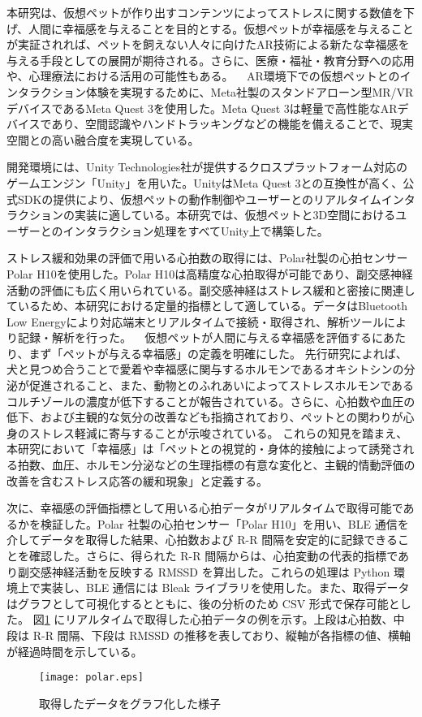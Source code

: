 \documentclass[a4j]{ltjsarticle}
\newcounter{seccnt}
\newcommand{\usection}[1]{\ \newline{\bf\underline{\theseccnt\stepcounter{seccnt}. #1}\hspace{10pt}}}
\begin{document}
本研究は、仮想ペットが作り出すコンテンツによってストレスに関する数値を下げ、人間に幸福感を与えることを目的とする。仮想ペットが幸福感を与えることが実証されれば、ペットを飼えない人々に向けたAR技術による新たな幸福感を与える手段としての展開が期待される。さらに、医療・福祉・教育分野への応用や、心理療法における活用の可能性もある。
\usection{関連技術}
AR環境下での仮想ペットとのインタラクション体験を実現するために、Meta社製のスタンドアローン型MR/VRデバイスであるMeta Quest 3を使用した。Meta Quest 3は軽量で高性能なARデバイスであり、空間認識やハンドトラッキングなどの機能を備えることで、現実空間との高い融合度を実現している。

開発環境には、Unity Technologies社が提供するクロスプラットフォーム対応のゲームエンジン「Unity」を用いた。UnityはMeta Quest 3との互換性が高く、公式SDKの提供により、仮想ペットの動作制御やユーザーとのリアルタイムインタラクションの実装に適している。本研究では、仮想ペットと3D空間におけるユーザーとのインタラクション処理をすべてUnity上で構築した。

ストレス緩和効果の評価で用いる心拍数の取得には、Polar社製の心拍センサーPolar H10を使用した。Polar H10は高精度な心拍取得が可能であり、副交感神経活動の評価にも広く用いられている。副交感神経はストレス緩和と密接に関連しているため、本研究における定量的指標として適している。データはBluetooth Low Energyにより対応端末とリアルタイムで接続・取得され、解析ツールにより記録・解析を行った。
\usection{研究の経緯}
仮想ペットが人間に与える幸福感を評価するにあたり、まず「ペットが与える幸福感」の定義を明確にした。
先行研究によれば、犬と見つめ合うことで愛着や幸福感に関与するホルモンであるオキシトシンの分泌が促進されること\cite{1}、また、動物とのふれあいによってストレスホルモンであるコルチゾールの濃度が低下すること\cite{2}が報告されている。さらに、心拍数や血圧の低下\cite{3}、および主観的な気分の改善なども指摘されており、ペットとの関わりが心身のストレス軽減に寄与することが示唆されている。
これらの知見を踏まえ、本研究において「幸福感」は「ペットとの視覚的・身体的接触によって誘発される拍数、血圧、ホルモン分泌などの生理指標の有意な変化と、主観的情動評価の改善を含むストレス応答の緩和現象」と定義する。

次に、幸福感の評価指標として用いる心拍データがリアルタイムで取得可能であるかを検証した。Polar 社製の心拍センサー「Polar H10」を用い、BLE 通信を介してデータを取得した結果、心拍数および R-R 間隔を安定的に記録できることを確認した。さらに、得られた R-R 間隔からは、心拍変動の代表的指標であり副交感神経活動を反映する RMSSD を算出した。これらの処理は Python 環境上で実装し、BLE 通信には Bleak ライブラリを使用した。また、取得データはグラフとして可視化するとともに、後の分析のため CSV 形式で保存可能とした。
図\ref{fig:polar} にリアルタイムで取得した心拍データの例を示す。上段は心拍数、中段は R-R 間隔、下段は RMSSD の推移を表しており、縦軸が各指標の値、横軸が経過時間を示している。
\begin{figure}[b]
  \centering
  \texttt{[image: polar.eps]}
  \caption{取得したデータをグラフ化した様子}
  \label{fig:polar}
\end{figure}
\end{document}
